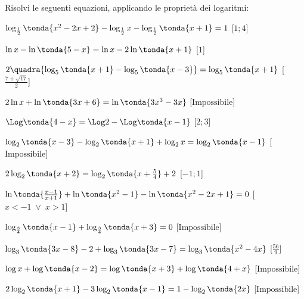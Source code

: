 \begin{esercizio}\label{ese:}
 Risolvi le seguenti equazioni, applicando le proprietà dei logaritmi:
 \begin{enumeratea}
   \item \(\log_{\frac{1}{2}} \tonda{x^2-2x+2}-\log_{\frac{1}{2}} x- \log_{\frac{1}{2}} \tonda{x+1}=1\)
   \hfill [\(1;4\)]
   \item \(\ln x-\ln \tonda{5-x}=\ln x-2\ln  \tonda{x+1}\)
   \hfill [\(1\)]
   \item \(2 \quadra{\log_5 \tonda{x+1}-\log_5 \tonda{x-3}}=\log_5 \tonda{x+1}\)
   \hfill [\(\frac{7+\sqrt{17}}{2}\)]
   \item \(2 \ln x+\ln \tonda{3x+6}=\ln \tonda{3x^3-3x}\)
   \hfill [\(\text{Impossibile}\)]
   \item \(\Log \tonda{4-x}=\Log 2 -\Log \tonda{x-1}\)
   \hfill [\(2 ;3\)]
   \item \(\log_2 \tonda{x-3} -\log_2 \tonda{x+1}+\log_2 x = \log_2 \tonda{x-1}\)
   \hfill [\(\text{Impossibile}\)]
   \item \(2 \log_2 \tonda{x+2}=\log_2 \tonda{x+\frac{5}{4}}+2\)
   \hfill [\(-1;1\)]
   \item \(\ln \tonda{\frac{x-1}{x+1}}+\ln \tonda{x^2-1}-\ln \tonda{x^2-2x+1}=0\)
   \hfill [\(x<-1 \;\lor\; x>1\)]
   \item \(\log_{\frac{3}{4}} \tonda{x-1}+\log_{\frac{3}{4}}\tonda{x+3}=0\)
   \hfill [\(\text{Impossibile}\)]
   \item \(\log_3 \tonda{3x-8}-2+\log_3 \tonda{3x-7}=\log_3 \tonda{x^2-4x}\)
   \hfill [\(\frac{56}{9}\)]
   \item  \(\log {x} +\log \tonda{x-2}=\log\tonda{x+3}+\log \tonda{4+x}\)
   \hfill [\(\text{Impossibile}\)]
   \item \(2\log_2 \tonda{x+1}-3\log_2 \tonda{x-1}=1-\log_2 \tonda{2x}\)
   \hfill [\(\text{Impossibile}\)]
 \end{enumeratea}
\end{esercizio}

